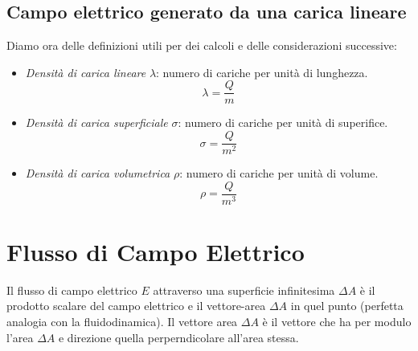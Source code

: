             \subsection{Campo elettrico generato da una carica lineare} Diamo 
            ora delle definizioni utili per dei calcoli e delle considerazioni
            successive:
            \begin{itemize}
                \item \textit{Densità di carica lineare} $\lambda$: numero di 
                cariche per unità di lunghezza.\\
                    \begin{equation}
                        \lambda = \frac{Q}{m}
                    \end{equation}
                \item \textit{Densità di carica superficiale} $\sigma$: numero 
                di cariche per unità di superifice.\\
                    \begin{equation}
                        \sigma = \frac{Q}{m^2}
                    \end{equation}
                \item \textit{Densità di carica volumetrica} $\rho$: numero
                di cariche per unità di volume.\\
                    \begin{equation}
                        \rho = \frac{Q}{m^3}
                    \end{equation}
            \end{itemize}

        \section{Flusso di Campo Elettrico} Il flusso di campo elettrico $E$ 
        attraverso una superficie infinitesima $\Delta A$ è il prodotto scalare
        del campo elettrico e il vettore-area $\Delta A$ in quel punto 
        (perfetta analogia con la fluidodinamica). Il vettore area $\Delta A$ è
        il vettore che ha per modulo l'area $\Delta A$ e direzione quella 
        perperndicolare all'area stessa.
